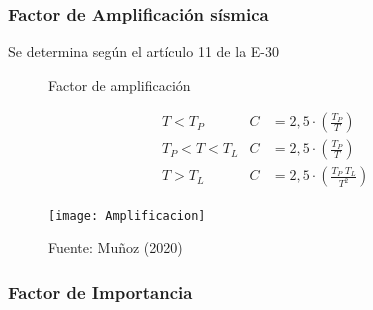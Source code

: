 \documentclass{article}%
\begin{document}
%
\subsubsection{Factor de Amplificación sísmica}%
\label{ssubsec:FactordeAmplificacinssmica}%
%
Se determina según el artículo 11 de la E{-}30%
\setlength{\jot}{0.5cm}%


\begin{figure}[h!]%
\caption{Factor de amplificación}%
\begin{minipage}{0.5\textwidth}%

    \begin{align*}
        &T< T_{P}         &   C&=2,5\cdot\left ( \frac{T_{P}}{T} \right )\\
        &T_{P}< T< T_{L}  &   C&=2,5\cdot\left ( \frac{T_{P}}{T} \right )\\
        &T> T_{L}         &   C&=2,5\cdot\left ( \frac{T_{P}\;T_{L}}{T^{2}} \right )
    \end{align*}%
\end{minipage}%
\begin{minipage}{0.4\textwidth}%
\centering%
\texttt{[image: Amplificacion]}%
\end{minipage}%
\caption*{Fuente: Muñoz (2020)}%
\end{figure}

%
\subsubsection{Factor de Importancia}%
\label{ssubsec:FactordeImportancia}%
%
\end{document}

